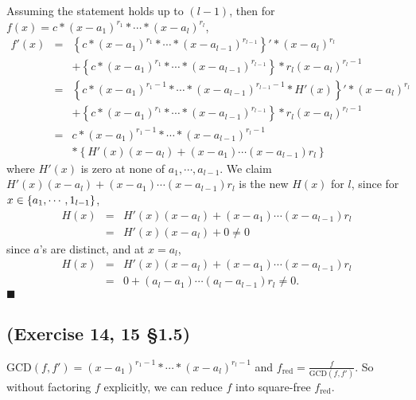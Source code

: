\documentclass[11pt]{book}
\begin{document}
Assuming the statement holds up to $(l-1)$, then for $f(x) = c * (x -a_1)^{r_1} *\cdots * (x-a_l)^{r_l}$,
\begin{eqnarray}
\nonumber
f'(x) &=& \left\{c * (x -a_1)^{r_1} *\cdots * (x-a_{l-1})^{r_{l-1}} \right\}' * (x-a_l)^{r_l} \\
&&+ \left\{c * (x -a_1)^{r_1} *\cdots * (x-a_{l-1})^{r_{l-1}} \right\} * r_l (x-a_l)^{r_l-1} \\
\nonumber
&=& \left\{c * (x -a_1)^{r_1-1} *\cdots * (x-a_{l-1})^{r_{l-1} -1} * H'(x) \right\}' * (x-a_l)^{r_l} \\
&&+ \left\{c * (x -a_1)^{r_1} *\cdots * (x-a_{l-1})^{r_{l-1}} \right\} * r_l (x-a_l)^{r_l-1} \\
\nonumber
&=& c * (x -a_1)^{r_1-1} *\cdots * (x-a_{l-1})^{r_{l} -1} \\
&&* \left\{ H'(x)(x-a_l) + (x-a_1)\cdots(x-a_{l-1}) r_l \right\}
\end{eqnarray}
where $H'(x)$ is zero at none of $a_1, \cdots, a_{l-1}$.
We claim $ H'(x)(x-a_l) + (x-a_1)\cdots(x-a_{l-1}) r_l $ is the new $H(x)$ for $l$, since for $x \in \{ a_1, \cdots, 1_{l-1}\} \\$,
\begin{eqnarray}
H(x) &=& H'(x)(x-a_l) + (x-a_1)\cdots(x-a_{l-1}) r_l\\  
&=& H'(x)(x-a_l) + 0 \neq 0
\end{eqnarray}
since $a$'s are distinct, and at $x=a_l$,
\begin{eqnarray}
H(x) &=& H'(x)(x-a_l) + (x-a_1)\cdots(x-a_{l-1}) r_l \\
&=& 0 + (a_l-a_1)\cdots (a_l-a_{l-1}) r_l \neq 0. 
\end{eqnarray}
$\blacksquare$

\subsection{(Exercise 14, 15 \S1.5)}
$\text{GCD}(f,f') = (x -a_1)^{r_1-1} *\cdots * (x-a_l)^{r_l-1}$ and $f_\text{red} = \frac{f}{\text{GCD}(f,f')}$.
So without factoring $f$ explicitly, we can reduce $f$ into square-free $f_\text{red}$.
\end{document}
